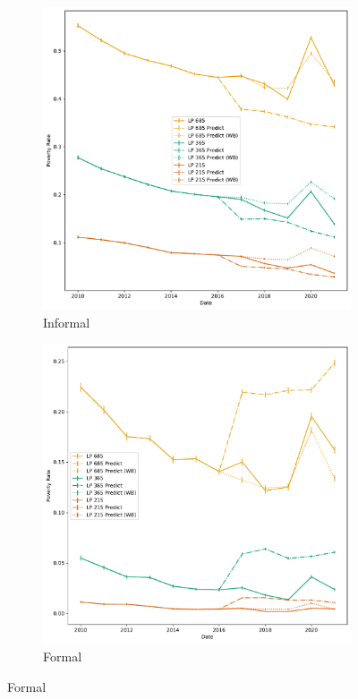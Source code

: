 \begin{figure}[H]
    \caption{Poverty Rate: by Job Category}
    \centering
         \centering
         \begin{subfigure}[b]{0.47\textwidth}
            \centering
            \includegraphics[width=\textwidth]{../figures/fig10a_poverty_rate_time_series_informal.pdf}        
            \caption{Informal}
         \end{subfigure}
         \hfill
         \begin{subfigure}[b]{0.47\textwidth}
            \centering
            \includegraphics[width=\textwidth]{../figures/fig10b_poverty_rate_time_series_formal.pdf}        
            \caption{Formal}
         \end{subfigure} 
\end{figure}


